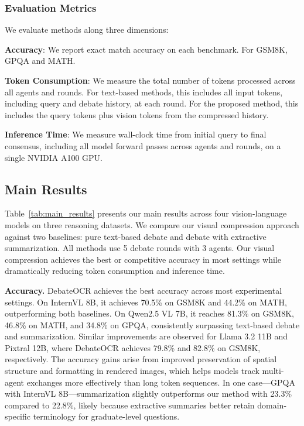 \documentclass{article}
\theoremstyle{plain}
\theoremstyle{definition}
\theoremstyle{remark}
\begin{document}
\subsubsection{Evaluation Metrics}
\label{subsubsec:metrics}

We evaluate methods along three dimensions:

\noindent\textbf{Accuracy}: We report exact match accuracy on each benchmark. For GSM8K, GPQA
and MATH.

\noindent\textbf{Token Consumption}: We measure the total number of tokens processed across all agents and rounds. For text-based methods, this includes all input tokens, including query and debate history, at each round. For the proposed method, this includes the query tokens plus vision tokens from the compressed history.



\noindent\textbf{Inference Time}: We measure wall-clock time from initial query to final 
consensus, including all model forward passes across agents and rounds, on a single 
NVIDIA A100 GPU.



\subsection{Main Results}
\label{subsec:main_results}

Table~\ref{tab:main_results} presents our main results across four vision-language models 
on three reasoning datasets. We compare our visual compression approach against two baselines: 
pure text-based debate and debate with extractive summarization. All methods use 5 debate 
rounds with 3 agents. Our visual compression achieves the best or competitive accuracy in 
most settings while dramatically reducing token consumption and inference time.

\textbf{Accuracy.}
DebateOCR achieves the best accuracy across most experimental settings. On InternVL 8B, it achieves 70.5\% on GSM8K and 44.2\% on MATH, outperforming both baselines. On Qwen2.5 VL 7B, it reaches 81.3\% on GSM8K, 46.8\% on MATH, and 34.8\% on GPQA, consistently surpassing text-based debate and summarization. Similar improvements are observed for Llama 3.2 11B and Pixtral 12B, where DebateOCR achieves 79.8\% and 82.8\% on GSM8K, respectively. The accuracy gains arise from improved preservation of spatial structure and formatting in rendered images, which helps models track multi-agent exchanges more effectively than long token sequences. In one case—GPQA with InternVL 8B—summarization slightly outperforms our method with 23.3\% compared to 22.8\%, likely because extractive summaries better retain domain-specific terminology for graduate-level questions.
\end{document}
